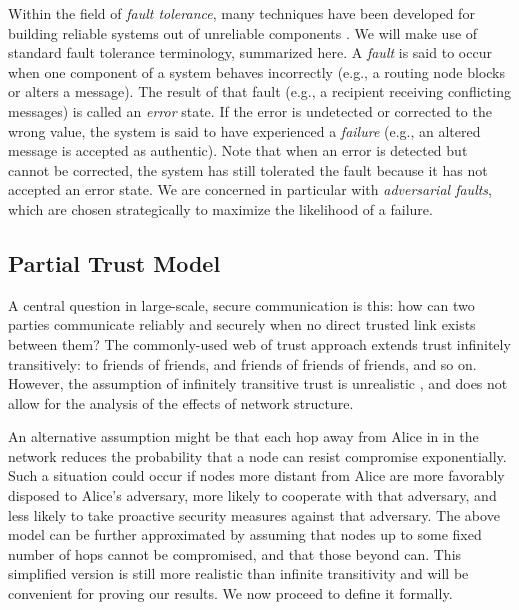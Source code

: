 \documentclass{sig-alternate-05-2015}
\begin{document}
Within the field of {\em fault tolerance},
many techniques have been developed for building reliable systems
out of unreliable components
\cite{avizienis_basic_2004, von_neumann_probabilistic_1956}.
We will make use of standard fault tolerance terminology, summarized here.
A {\em fault} is said to occur when one component
of a system behaves incorrectly (e.g., a routing node blocks or
alters a message).
The result of that fault (e.g., a recipient receiving conflicting messages)
is called an {\em error} state.
If the error is undetected or corrected to the wrong value, the system is
said to have experienced a {\em failure} (e.g., an altered message is
accepted as authentic).
Note that when an error is detected but cannot be corrected,
the system has still tolerated the fault because it has not accepted an error
state.
We are concerned in particular with {\em adversarial faults},
which are chosen strategically to maximize the likelihood of a failure.

\subsection{Partial Trust Model}

A central question in large-scale, secure communication is this:
how can two parties communicate reliably and securely
when no direct trusted link exists between them?
The commonly-used web of trust approach
\cite{zimmermann_official_1995,ferguson_practical_2003}
extends trust infinitely transitively:
to friends of friends, and friends of friends of friends, and so on.
However, the assumption of infinitely transitive trust is unrealistic
\cite{christianson_why_1997},
and does not allow for the analysis of the effects of network structure.

An alternative assumption might be that each hop away from Alice in
in the network
reduces the probability that a node can resist compromise exponentially.
Such a situation could occur if nodes more distant from Alice are
more favorably disposed to Alice's adversary, more likely to cooperate with that
adversary, and less likely to take proactive security measures against that
adversary.
The above model can be further
approximated by assuming that nodes up to some fixed number
of hops cannot be compromised, and that those beyond can.
This simplified version is still more realistic than infinite transitivity
and will be convenient for proving our results.
We now proceed to define it formally.
\end{document}
